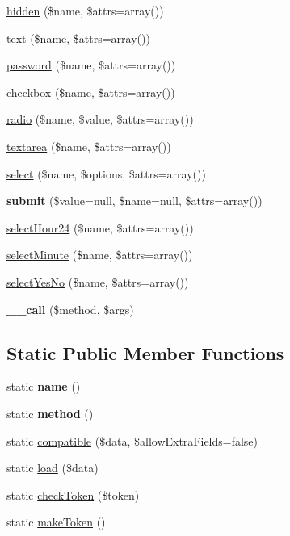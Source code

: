 \begin{DoxyCompactItemize}
\item 
\hyperlink{classForm_a3c7226192b6c4a6d098db567dc00fba1}{hidden} (\$name, \$attrs=array())
\item 
\hyperlink{classForm_a7856398bee38d7cc0a5e805079651725}{text} (\$name, \$attrs=array())
\item 
\hyperlink{classForm_a88fa3b1b21917530621c45e121c6e273}{password} (\$name, \$attrs=array())
\item 
\hyperlink{classForm_ab5a5c2d036613181c1fd69356bf9ac7f}{checkbox} (\$name, \$attrs=array())
\item 
\hyperlink{classForm_a3394ae873b4192b6f3827dae49bb3ee1}{radio} (\$name, \$value, \$attrs=array())
\item 
\hyperlink{classForm_a2ce53f56957c430f52afed0f7a8b900f}{textarea} (\$name, \$attrs=array())
\item 
\hyperlink{classForm_a4721ca44be121370629b04e364c70a41}{select} (\$name, \$options, \$attrs=array())
\item 
\hypertarget{classForm_a1a00cdcd2d270441510a6a4858ea9103}{
{\bfseries submit} (\$value=null, \$name=null, \$attrs=array())}
\label{classForm_a1a00cdcd2d270441510a6a4858ea9103}

\item 
\hyperlink{classForm_a66e9d055a0daa51aa1c5b4dd62f3f82b}{selectHour24} (\$name, \$attrs=array())
\item 
\hyperlink{classForm_ae1d9a2ca2ec79f9cf872014397447273}{selectMinute} (\$name, \$attrs=array())
\item 
\hyperlink{classForm_aea60ffaa701fea429e51ceddb3712298}{selectYesNo} (\$name, \$attrs=array())
\item 
\hypertarget{classForm_ab47a12ae2f9f2cb205de386aa259bbc8}{
{\bfseries \_\-\_\-call} (\$method, \$args)}
\label{classForm_ab47a12ae2f9f2cb205de386aa259bbc8}

\end{DoxyCompactItemize}
\subsection*{Static Public Member Functions}
\begin{DoxyCompactItemize}
\item 
\hypertarget{classForm_afe6750a98993c81da710af555a6ec3f7}{
static {\bfseries name} ()}
\label{classForm_afe6750a98993c81da710af555a6ec3f7}

\item 
\hypertarget{classForm_a81d48ddffcbdcaf2a7442f4d892a44e0}{
static {\bfseries method} ()}
\label{classForm_a81d48ddffcbdcaf2a7442f4d892a44e0}

\item 
static \hyperlink{classForm_a51c909fa03f961faadc70d1f8121e656}{compatible} (\$data, \$allowExtraFields=false)
\item 
static \hyperlink{classForm_a24944df6f9d5a439fbcd1bf4620a045c}{load} (\$data)
\item 
static \hyperlink{classForm_a3f3b1451e012697f0fca2bc3a09c6a44}{checkToken} (\$token)
\item 
static \hyperlink{classForm_a39acd9ac38411bf19951b993dea7e8b1}{makeToken} ()
\end{DoxyCompactItemize}
